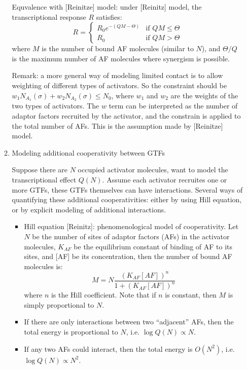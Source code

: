 \documentclass[11pt]{article}
\begin{document}
\begin{enumerate}
\begin{enumerate}
Equvalence with [Reinitze] model: under [Reinitz] model, the transcriptional response $R$ satisfies: 
\begin{equation}
R = \left\{ \begin{array}{ll}
R_0 e^{-(QM - \Theta)} & \text{if $QM \leq \Theta$}\\
R_0 & \text{if $QM > \Theta$}
\end{array} \right.
\end{equation}
where $M$ is the number of bound AF molecules (similar to $N$), and $\Theta / Q$ is the maximum number of AF molecules where synergism is possible. 

Remark: a more general way of modeling limited contact is to allow weighting of different types of activators. So the constraint should be $w_1 N_{A_1}(\sigma) + w_2 N_{A_2}(\sigma) \leq N_0$, where $w_1$ and $w_2$ are the weights of the two types of activators. The $w$ term can be interpreted as the number of adaptor factors recruited by the activator, and the constrain is applied to the total number of AFs. This is the assumption made by [Reinitze] model. 

\item{Modeling additional cooperativity between GTFs}

Suppose there are $N$ occupied activator molecules, want to model the transcriptional effect $Q(N)$. Assume each activator recruites one or more GTFs, these GTFs themselves can have interactions. Several ways of quantifying these additional cooperativities: either by using Hill equation, or by explicit modeling of additional interactions. 
\begin{itemize}
\item Hill equation [Reinitz]: phenomenological model of cooperativity. Let $N$ be the number of sites of adaptor factors (AFs) in the activator molecules, $K_{AF}$ be the equilibrium constant of binding of AF to its sites, and [AF] be its concentration, then the number of bound AF molecules is: 
\begin{equation}
M = N \frac{(K_{AF}[AF])^n}{1 + (K_{AF}[AF])^n}
\end{equation}
where $n$ is the Hill coefficient. Note that if $n$ is constant, then $M$ is simply proportional to $N$. 

\item If there are only interactions between two ``adjacent'' AFs, then the total energy is proportional to $N$, i.e. $\log Q(N) \propto N$. 

\item If any two AFs could interact, then the total energy is $O(N^2)$, i.e. $\log Q(N) \propto N^2$. 
  

\end{itemize}
\end{enumerate}
\end{enumerate}
\end{document}
